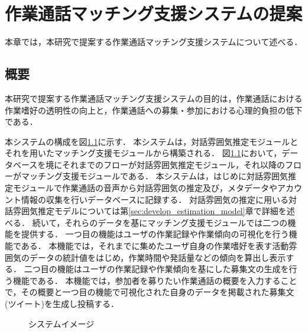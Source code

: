 \chapter{作業通話マッチング支援システムの提案\label{sec:proposal_system}}
\thispagestyle{plain}

本章では，本研究で提案する作業通話マッチング支援システムについて述べる．

\section{概要}

本研究で提案する作業通話マッチング支援システムの目的は，作業通話における作業嗜好の透明性の向上と，作業通話への募集・参加における心理的負担の低下である．

本システムの構成を図\ref{fig:matching_system_big_arrow}に示す．
本システムは，対話雰囲気推定モジュールとそれを用いたマッチング支援モジュールから構築される．
図\ref{fig:matching_system_big_arrow}において，データベースを境にそれまでのフローが対話雰囲気推定モジュール，それ以降のフローがマッチング支援モジュールである．
本システムは，はじめに対話雰囲気推定モジュールで作業通話の音声から対話雰囲気の推定及び，メタデータやアカウント情報の収集を行いデータベースに記録する．
対話雰囲気の推定に用いる対話雰囲気推定モデルについては第\ref{sec:develop_estimation_model}章で詳細を述べる．
続いて，それらのデータを基にマッチング支援モジュールでは二つの機能を提供する．
一つ目の機能はユーザの作業記録や作業傾向の可視化を行う機能である．
本機能では，それまでに集めたユーザ自身の作業嗜好を表す活動雰囲気のデータの統計値をはじめ，作業時間や発話量などの傾向を算出し表示する．
二つ目の機能はユーザの作業記録や作業傾向を基にした募集文の生成を行う機能である．
本機能では，参加者を募りたい作業通話の概要を入力することで，その概要と一つ目の機能で可視化された自身のデータを掲載された募集文(ツイート)を生成し投稿する．

\begin{figure}
    \centering
    \caption{システムイメージ}
    \label{fig:matching_system_big_arrow}
\end{figure}

